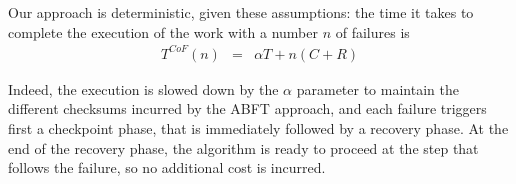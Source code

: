 Our approach is deterministic, given these assumptions: the time it takes to
complete the execution of the work with a number $n$ of failures is
\begin{eqnarray}
T^{CoF}(n) &=& \alpha T + n ( C + R )
\end{eqnarray}

Indeed, the execution is slowed down by the $\alpha$ parameter to
maintain the different checksums incurred by the ABFT approach, and
each failure triggers first a \cof checkpoint phase, that is immediately
followed by a recovery phase. At the end of the recovery phase, the
algorithm is ready to proceed at the step that follows the failure, so
no additional cost is incurred.

\begin{comment}
The periodical coordinated blocking checkpointing technique can be characterized
with the following parameters:
\begin{itemize}
\item $c$, the time it takes for all processes to save their state
  when the timer expires
\item $r$, the time it takes all processes to restart from this
  checkpoint (load the checkpoint from file)
\item $t$ is the time interval between two checkpoints. This value is
  usually set to something as close as possible to the expected MTBF,
  to avoid unnecessary overheads. It must be set low enough, though,
  to allow for progress.
\end{itemize}
In the coordinated checkpointing approach, the duration of the
execution depends upon the moment of the failures: if a failure hits
the system just after a checkpoint, little time is spent recomputing the
lost progress between the last checkpoint and the failure step. If a
failure hits the system just before a checkpoint,
then the recovery restarts from the last checkpoint and the last
time interval must be entirely re-executed. To model this, we define
two extreme cases: the best case, noted $T^{CC}_B(n)$ (for Time,
Coordinated Checkpointing, Best case), and $T^{CC}_W(n)$ (for Time,
Coordinated Checkpointing, Worst case). These functions can be defined
recursively as follows:
$$
\left\{\begin{array}{l}
T^{CC}_B(0) = T + c T/t\\
T^{CC}_B(n) = T^{CC}_B(n-1) + r + c r/t\\
\end{array}\right.$$
$$\left\{\begin{array}{l}
T^{CC}_W(0) = T + c T/t\\
T^{CC}_W(n) = T^{CC}_W(n-1) + r + t+ c (r+t)/t\\
\end{array}\right.
$$


\end{comment}
